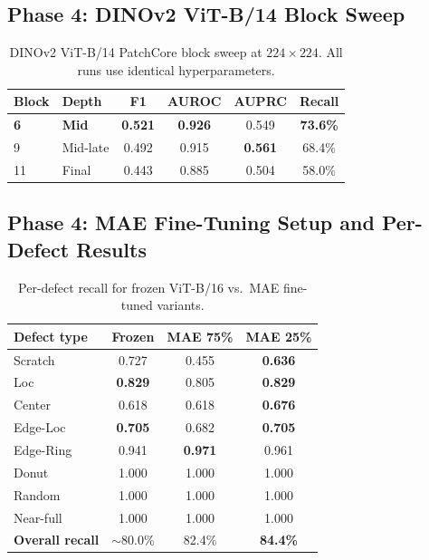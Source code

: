 \documentclass[11pt]{article}
\begin{document}
\subsection{Phase 4: DINOv2 ViT-B/14 Block Sweep}
\label{app:dinov2_block_sweep}

\begin{table}[H]
\centering
\caption{DINOv2 ViT-B/14 PatchCore block sweep at $224\!\times\!224$. All runs use identical hyperparameters.}
\label{tab:dinov2_block_sweep}
\begin{tabular}{llcccc}
\toprule
Block & Depth    & F1             & AUROC          & AUPRC          & Recall \\
\midrule
\textbf{6}   & \textbf{Mid} & \textbf{0.521} & \textbf{0.926} & 0.549     & \textbf{73.6\%} \\
9            & Mid-late & 0.492          & 0.915          & \textbf{0.561} & 68.4\% \\
11           & Final    & 0.443          & 0.885          & 0.504          & 58.0\% \\
\bottomrule
\end{tabular}
\end{table}

\subsection{Phase 4: MAE Fine-Tuning Setup and Per-Defect Results}
\label{app:mae_finetune}

\begin{table}[H]
\centering
\caption{Per-defect recall for frozen ViT-B/16 vs.\ MAE fine-tuned variants.}
\label{tab:vit_mae_per_defect}
\begin{tabular}{lccc}
\toprule
\textbf{Defect type} & \textbf{Frozen} & \textbf{MAE 75\%} & \textbf{MAE 25\%} \\
\midrule
Scratch   & 0.727          & 0.455 & \textbf{0.636} \\
Loc       & \textbf{0.829} & 0.805 & \textbf{0.829} \\
Center    & 0.618          & 0.618 & \textbf{0.676} \\
Edge-Loc  & \textbf{0.705} & 0.682 & \textbf{0.705} \\
Edge-Ring & 0.941          & \textbf{0.971} & 0.961 \\
Donut     & 1.000          & 1.000 & 1.000 \\
Random    & 1.000          & 1.000 & 1.000 \\
Near-full & 1.000          & 1.000 & 1.000 \\
\midrule
\textbf{Overall recall} & ${\sim}$80.0\% & 82.4\% & \textbf{84.4\%} \\
\bottomrule
\end{tabular}
\end{table}
\end{document}
